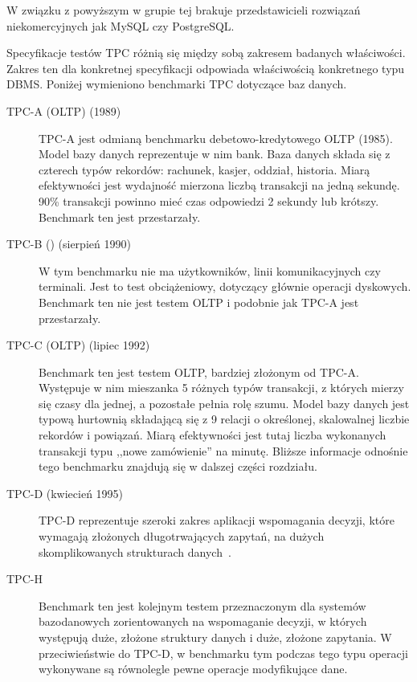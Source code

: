 \noindent%
W związku z powyższym w grupie tej brakuje przedstawicieli rozwiązań niekomercyjnych jak
MySQL czy PostgreSQL.

Specyfikacje testów TPC różnią się między sobą zakresem badanych właściwości. 
Zakres ten dla konkretnej specyfikacji odpowiada właściwością konkretnego typu DBMS.
Poniżej wymieniono benchmarki TPC dotyczące baz danych.

\begin{description}
\item[TPC-A (OLTP) (1989)] 
TPC-A jest odmianą benchmarku debetowo-kredytowego OLTP (1985). Model bazy danych reprezentuje
w nim bank. Baza danych składa się z czterech typów rekordów: rachunek, kasjer, oddział, historia.
Miarą efektywności jest wydajność mierzona liczbą transakcji na jedną sekundę. 90\% transakcji powinno mieć czas
odpowiedzi 2 sekundy lub krótszy. Benchmark ten jest przestarzały. 

\item[TPC-B () (sierpień 1990)]
W tym benchmarku nie ma użytkowników, linii komunikacyjnych czy terminali. Jest to test obciążeniowy,
dotyczący głównie operacji dyskowych. Benchmark ten nie jest testem OLTP i podobnie jak TPC-A jest przestarzały.

\item[TPC-C (OLTP) (lipiec 1992)]
Benchmark ten jest testem OLTP, bardziej złożonym od TPC-A. Występuje w nim mieszanka 5 różnych typów transakcji,
z których mierzy się czasy dla jednej, a pozostałe pełnia rolę szumu. Model bazy danych jest typową hurtownią składającą 
się z 9 relacji o określonej, skalowalnej liczbie rekordów i powiązań. Miarą efektywności jest tutaj liczba wykonanych 
transakcji typu ,,nowe zamówienie'' na minutę. Bliższe informacje odnośnie tego benchmarku znajdują się w dalszej części rozdziału.  

\item[TPC-D (kwiecień 1995)]
TPC-D reprezentuje szeroki zakres aplikacji wspomagania decyzji, które wymagają złożonych długotrwających zapytań,
na dużych skomplikowanych strukturach danych~\cite{TPC1}.

\item[TPC-H]
Benchmark ten jest kolejnym testem przeznaczonym dla systemów bazodanowych zorientowanych na wspomaganie decyzji,
w których występują duże, złożone struktury danych i duże, złożone zapytania. W przeciwieństwie do TPC-D, w benchmarku
tym podczas tego typu operacji wykonywane są równolegle pewne operacje modyfikujące dane.


\end{description}
